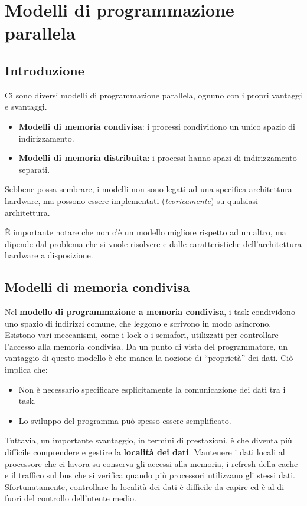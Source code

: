 \chapter{Modelli di programmazione parallela}
\section{Introduzione}
Ci sono diversi modelli di programmazione parallela,
ognuno con i propri vantaggi e svantaggi.
\begin{itemize}
  \item \textbf{Modelli di memoria condivisa}: i processi
    condividono un unico spazio di indirizzamento.
  \item \textbf{Modelli di memoria distribuita}: i processi
    hanno spazi di indirizzamento separati.
\end{itemize}
Sebbene possa sembrare, i modelli non sono legati 
ad una specifica architettura hardware, ma possono 
essere implementati (\textit{teoricamente}) su qualsiasi
architettura.

È importante notare che non c'è un modello migliore
rispetto ad un altro, ma dipende dal problema che si
vuole risolvere e dalle caratteristiche dell'architettura
hardware a disposizione.

\section{Modelli di memoria condivisa}
Nel \textbf{modello di programmazione a memoria condivisa},
i task condividono uno spazio di indirizzi comune, che
leggono e scrivono in modo asincrono. Esistono vari
meccanismi, come i lock o i semafori, utilizzati per
controllare l'accesso alla memoria condivisa. Da un punto
di vista del programmatore, un vantaggio di questo modello
è che manca la nozione di ``proprietà'' dei dati. Ciò
implica che:
\begin{itemize}
    \item Non è necessario specificare esplicitamente
    la comunicazione dei dati tra i task.
    \item Lo sviluppo del programma può spesso essere
    semplificato.
\end{itemize}

Tuttavia, un importante svantaggio, in termini di
prestazioni, è che diventa più difficile comprendere
e gestire la \textbf{località dei dati}. Mantenere i
dati locali al processore che ci lavora su conserva gli
accessi alla memoria, i refresh della cache e il traffico
sul bus che si verifica quando più processori utilizzano
gli stessi dati. Sfortunatamente, controllare la località
dei dati è difficile da capire ed è al di fuori del
controllo dell'utente medio.

